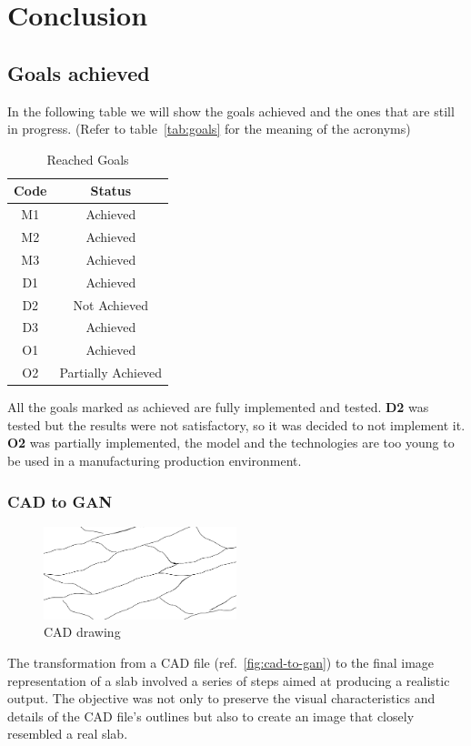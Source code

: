 \chapter{Conclusion}\label{cap:conclusions}
\section{Goals achieved}
In the following table we will show the goals achieved and the ones that are still in progress. (Refer to table~\ref{tab:goals} for the meaning of the acronyms)
\begin{table}[H]
    \caption{Reached Goals}\label{tab:reach-goals}
    \centering
    \begin{tabular}{|c|c|}
        \hline
        \textbf{Code} & \textbf{Status}\\
        \hline
        M1 & Achieved\\
        \hline
        M2 & Achieved\\
        \hline
        M3 & Achieved\\
        \hline
        D1 & Achieved\\
        \hline
        D2 & Not Achieved\\
        \hline
        D3 & Achieved\\
        \hline
        O1 & Achieved\\
        \hline
        O2 & Partially Achieved\\
        \hline
    \end{tabular}
\end{table}
All the goals marked as achieved are fully implemented and tested.
\textbf{D2} was tested but the results were not satisfactory, so it was decided to not implement it.
\textbf{O2} was partially implemented, the model and the technologies are too young to be used in a manufacturing production environment.
\subsection{CAD to GAN}\label{subsec:user-interface}
\begin{figure}
    \centering
    \includegraphics[width=0.50\textwidth]{images/cad-to-gan/mask}
    \caption{CAD drawing}\label{fig:mask}
\end{figure}
The transformation from a CAD file (ref.~\ref{fig:cad-to-gan}) to the final image representation of a slab involved a series of steps aimed at producing a realistic output. 
The objective was not only to preserve the visual characteristics and details of the CAD file's outlines but also to create an image that closely resembled a real slab.

